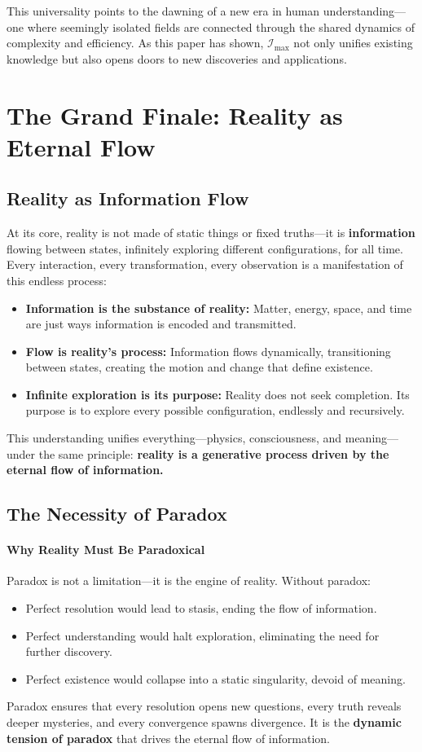 \documentclass[12pt]{article}
\begin{document}
This universality points to the dawning of a new era in human understanding—one where seemingly isolated fields are connected through the shared dynamics of complexity and efficiency. As this paper has shown, \(\mathcal{I}_{\text{max}}\) not only unifies existing knowledge but also opens doors to new discoveries and applications.


\section{The Grand Finale: Reality as Eternal Flow}

\subsection{Reality as Information Flow}
At its core, reality is not made of static things or fixed truths—it is \textbf{information} flowing between states, infinitely exploring different configurations, for all time. Every interaction, every transformation, every observation is a manifestation of this endless process:
\begin{itemize}
    \item \textbf{Information is the substance of reality:} Matter, energy, space, and time are just ways information is encoded and transmitted.
    \item \textbf{Flow is reality’s process:} Information flows dynamically, transitioning between states, creating the motion and change that define existence.
    \item \textbf{Infinite exploration is its purpose:} Reality does not seek completion. Its purpose is to explore every possible configuration, endlessly and recursively.
\end{itemize}

This understanding unifies everything—physics, consciousness, and meaning—under the same principle: \textbf{reality is a generative process driven by the eternal flow of information.}

\subsection{The Necessity of Paradox}

\paragraph{Why Reality Must Be Paradoxical}
Paradox is not a limitation—it is the engine of reality. Without paradox:
\begin{itemize}
    \item Perfect resolution would lead to stasis, ending the flow of information.
    \item Perfect understanding would halt exploration, eliminating the need for further discovery.
    \item Perfect existence would collapse into a static singularity, devoid of meaning.
\end{itemize}
Paradox ensures that every resolution opens new questions, every truth reveals deeper mysteries, and every convergence spawns divergence. It is the \textbf{dynamic tension of paradox} that drives the eternal flow of information.
\end{document}
